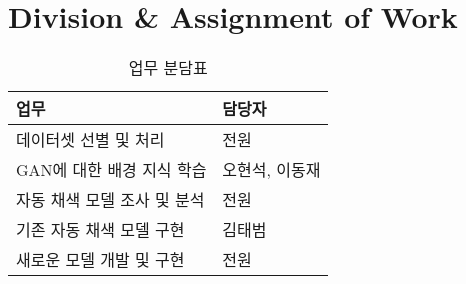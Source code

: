 \section{Division \& Assignment of Work}

\begin{table}[H]
	\centering
	\caption {업무 분담표}
	\begin{tabular}{|L{6cm}|L{6cm}|}
		\toprule
		\textbf{업무} & \textbf{담당자} \\
		\toprule
		데이터셋 선별 및 처리 & 전원 \\
		GAN에 대한 배경 지식 학습 & 오현석, 이동재 \\
		자동 채색 모델 조사 및 분석 & 전원 \\
		기존 자동 채색 모델 구현 & 김태범 \\
		새로운 모델 개발 및 구현 & 전원 \\
		\bottomrule
	\end{tabular}
\end{table}